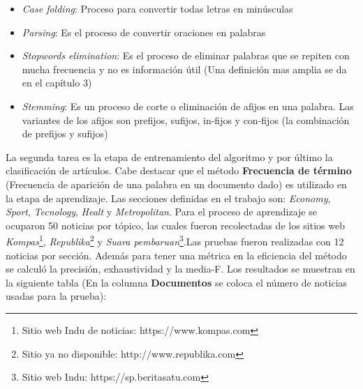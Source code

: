 \begin{itemize}

	\item \textit{Case folding}: Proceso para convertir todas letras en minúsculas
	\item \textit{Parsing}: Es el proceso de convertir oraciones en palabras
	\item \textit{Stopwords elimination}: Es el proceso de eliminar palabras que se repiten con mucha frecuencia y no es información útil (Una definición mas amplia se da en el capítulo 3)
	\item \textit{Stemming}: Es un proceso de corte o eliminación de afijos en una palabra. Las variantes de los afijos son prefijos, sufijos, in-fijos y con-fijos (la combinación de prefijos y sufijos)

\end{itemize}	

La segunda tarea es la etapa de entrenamiento del algoritmo y por último la clasificación de artículos. Cabe destacar que el método \textbf{Frecuencia de término} (Frecuencia de aparición de una palabra en un documento dado) es utilizado en la etapa de aprendizaje. Las secciones definidas en el trabajo son: \textit{Economy}, \textit{Sport}, \textit{Tecnology}, \textit{Healt} y \textit{Metropolitan}. Para el proceso de aprendizaje se ocuparon 50 noticias por tópico, las cuales fueron recolectadas de los sitios web \textit{Kompas}\footnote{Sitio web Indu de noticias: https://www.kompas.com}, \textit{Republika}\footnote{Sitio ya no disponible: http://www.republika.com} y \textit{Suara pembaruan}\footnote{Sitio web Indu: https://sp.beritasatu.com}.Las pruebas fueron realizadas con 12 noticias por sección. Además para tener una métrica en la eficiencia del método se calculó la precisión, exhaustividad y la media-F. Los resultados se muestran en  la siguiente tabla (En la columna \textbf{Documentos} se coloca el número de noticias usadas para la prueba):\\


